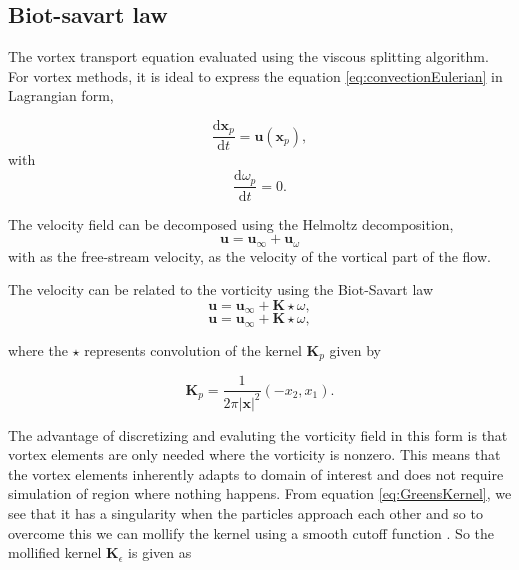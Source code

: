 \subsection{Biot-savart law}
The vortex transport equation evaluated using the viscous splitting algorithm. For vortex methods, it is ideal to express the equation \ref{eq:convectionEulerian} in Lagrangian form,

\begin{equation}
\frac{\mathrm{d}\mathbf{x}_p}{\mathrm{d}t} = \mathbf{u}\left(\mathbf{x}_p\right),
\end{equation}
with
\begin{equation}
\frac{\mathrm{d}\omega_p}{\mathrm{d}t} = 0.
\end{equation}

The velocity field can be decomposed using the Helmoltz decomposition,
\begin{equation}
\mathbf{u} = \mathbf{u}_{\infty} + \mathbf{u}_{\omega}
\end{equation}
with  as the free-stream velocity,  as the velocity of the vortical part of the flow.


The velocity can be related to the vorticity using the Biot-Savart law
\begin{equation}
\mathbf{u} = \mathbf{u}_{\infty} + \mathbf{K}\star\omega,
\end{equation}
\begin{equation}
\mathbf{u} = \mathbf{u}_{\infty} + \mathbf{K}\star\omega,
\end{equation}

where the $\star$ represents convolution of the kernel $\mathbf{K}_p$ given by

\begin{equation}
\mathbf{K}_p = \frac{1}{2\pi\left|\mathbf{x}\right|^2}\left(-x_2,x_1\right).
\label{eq:GreensKernel}
\end{equation}

The advantage of discretizing and evaluting the vorticity field in this form is that vortex elements are only needed where the vorticity is nonzero. This means that the vortex elements inherently adapts to domain of interest and does not require simulation of region where nothing happens. From equation \ref{eq:GreensKernel}, we see that it has a singularity when the particles approach each other and so to overcome this we can mollify the kernel using a smooth cutoff function . So the mollified kernel $\mathbf{K}_{\epsilon}$ is given as 

